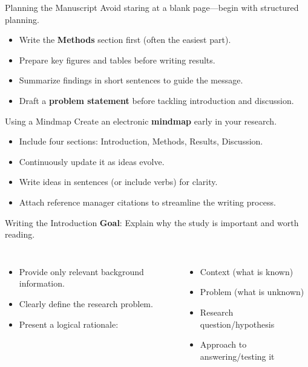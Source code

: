 \begin{frame}{Planning the Manuscript}
  Avoid staring at a blank page—begin with structured planning.
  \pause
  \begin{itemize}
    \item Write the \textbf{Methods} section first (often the easiest part).
      \pause
    \item Prepare key figures and tables before writing results.
      \pause
    \item Summarize findings in short sentences to guide the message.
      \pause
    \item Draft a \textbf{problem statement} before tackling introduction and discussion.
  \end{itemize}
\end{frame}

\begin{frame}{Using a Mindmap}
  Create an electronic \textbf{mindmap} early in your research.
  \pause
  \begin{itemize}
    \item Include four sections: Introduction, Methods, Results, Discussion.
      \pause
    \item Continuously update it as ideas evolve.
      \pause
    \item Write ideas in sentences (or include verbs) for clarity.
      \pause
    \item Attach reference manager citations to streamline the writing process.
  \end{itemize}
\end{frame}

\begin{frame}{Writing the Introduction}
  \textbf{Goal}: Explain why the study is important and worth reading.
  \vspace{0.5cm}
  \pause
  \begin{columns}
    \begin{itemize}
      \item Provide only relevant background information.
        \pause
      \item Clearly define the research problem.
        \pause
      \item Present a logical rationale:
    \end{itemize}
    \pause
    \begin{itemize}
      \item Context (what is known)
      \item Problem (what is unknown)
      \item Research question/hypothesis
      \item Approach to answering/testing it
    \end{itemize}
  \end{columns}
\end{frame}

